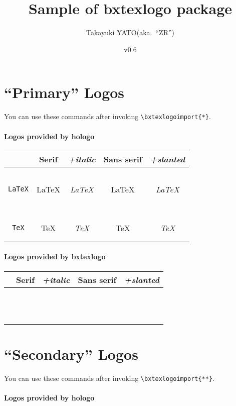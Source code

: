 \documentclass[a4paper]{article}
\newcommand{\PkgVersion}{0.6}
\newcommand{\PkgDate}{2022/05/05}
\newcommand{\Pkg}[1]{\textsf{#1}}
\newenvironment{LogoSamples}{%
  \begin{center}\begin{tabular}{ccccc}
    \hline \phantom{\LARGE I}
        & \textrm{Serif} & \textit{+italic}
        & \textsf{Sans serif} & \textsl{+slanted}
    \\\hline
}{%
    \hline
  \end{tabular}\end{center}
}
\newcommand*{\LSEntry}[1]{%
  \texttt{\string#1} & \textrm{#1} & \textit{#1}
      & \textsf{#1} & \textsf{\textsl{#1}}
  \\}
\begin{document}
\title{Sample of \Pkg{bxtexlogo} package}
\author{Takayuki YATO\quad (aka.~``ZR'')}
\date{v\PkgVersion \quad[\PkgDate]}
\maketitle

\section{``Primary'' Logos}

You can use these commands after invoking
\verb|\bxtexlogoimport{*}|.

\paragraph{Logos provided by \Pkg{hologo}}\mbox{}

\begin{LogoSamples}
\LSEntry{\AmSLaTeX}
\LSEntry{\AmSTeX}
\LSEntry{\BibTeX}
\LSEntry{\ConTeXt}
\LSEntry{\eTeX}
\LSEntry{\LaTeX}
\LSEntry{\LaTeXe}
\LSEntry{\LuaLaTeX}
\LSEntry{\LuaTeX}
\LSEntry{\LyX}
\LSEntry{\METAFONT}
\LSEntry{\METAPOST}
\LSEntry{\pdfTeX}
\LSEntry{\pdfLaTeX}
\LSEntry{\TeX}
\LSEntry{\XeLaTeX}
\LSEntry{\XeTeX}
\end{LogoSamples}

\paragraph{Logos provided by \Pkg{bxtexlogo}}\mbox{}

\begin{LogoSamples}
\LSEntry{\epTeX}
\LSEntry{\eupTeX}
\LSEntry{\JBibTeX}
\LSEntry{\pBibTeX}
\LSEntry{\pLaTeXe}
\LSEntry{\pLaTeX}
\LSEntry{\pTeX}
\LSEntry{\TikZ}
\LSEntry{\upBibTeX}
\LSEntry{\upLaTeX}
\LSEntry{\upLaTeXe}
\LSEntry{\upTeX}
\end{LogoSamples}

\newpage
\section{``Secondary'' Logos}

You can use these commands after invoking
\verb|\bxtexlogoimport{**}|.

\paragraph{Logos provided by \Pkg{hologo}}\mbox{}
\end{document}
